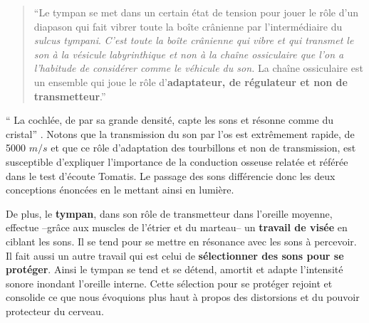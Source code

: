 \begin{quotation}
	``Le tympan se met dans un certain état de tension pour jouer le
	rôle d'un diapason qui fait vibrer toute la boîte crânienne
	par l'intermédiaire du \emph{sulcus tympani}.
	\emph{C'est toute la boîte crânienne qui vibre et qui transmet le son à
		la vésicule labyrinthique et non à la chaîne ossiculaire que l'on a l'habitude
		de considérer comme le véhicule du son.} La chaîne ossiculaire est un ensemble
	qui
	joue le rôle d'\textbf{adaptateur, de régulateur et non de transmetteur}.'' \autocite {tomatis_conf1972}

\end{quotation}
\enquote {	La cochlée, de par sa grande densité, capte les sons
	et résonne comme du cristal}  \autocite {tomatis_conf1972}.
Notons que la transmission du son par l'os est extrêmement rapide, de
5000 $m/s$ et que ce rôle d'adaptation des tourbillons et non de transmission, 
est susceptible d'expliquer l'importance de  
la conduction osseuse relatée et référée dans le  test d'écoute Tomatis.
Le passage des sons différencie donc les deux conceptions énoncées 
en le mettant ainsi en lumière. 

De plus, le \textbf{tympan}, dans son rôle de transmetteur dans l'oreille
          moyenne, effectue --grâce aux muscles de l'étrier et du marteau--
		un\textbf{ travail de visée} en ciblant les sons. Il
se tend
		pour se mettre en résonance avec les sons à percevoir.
               Il fait aussi un autre travail qui est celui de \textbf{sélectionner des
sons
		pour se protéger}. Ainsi le tympan se tend et se détend,
              amortit et adapte
l'intensité
		sonore inondant  l'oreille interne. Cette sélection pour se  protéger rejoint et consolide ce que nous 
		évoquions plus haut à propos des 
distorsions et du pouvoir protecteur du cerveau.


